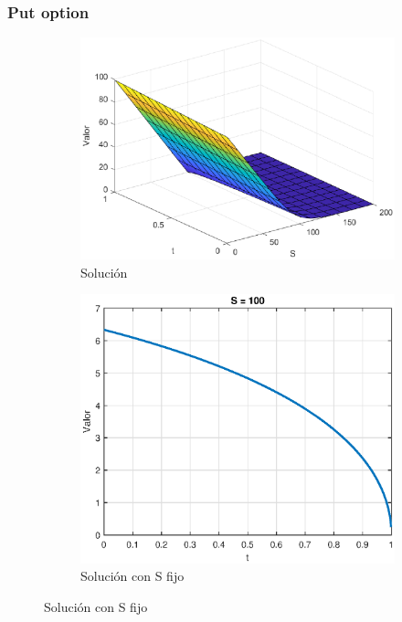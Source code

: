 \subsubsection{Put option}
\begin{figure}[H]
    \centering
    \begin{subfigure}[b]{0.35\linewidth}
        \includegraphics[width=\linewidth]{Imagenes/6_Sols/Put/Put3D.eps}
        \caption{Solución}
    \end{subfigure}
    \begin{subfigure}[b]{0.35\linewidth}
        \includegraphics[width=\linewidth]{Imagenes/6_Sols/Put/PutSFijo.eps}
        \caption{Solución con S fijo}

\end{subfigure}
\end{figure}
